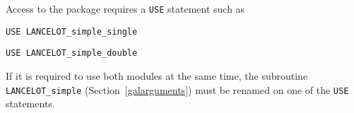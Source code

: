 \documentclass{galahad}
\newcommand{\fullpackagename}{LANC\-E\-LOT\-\_simple}
\begin{document}
Access to the package requires a {\tt USE} statement such as

\medskip{}

\hskip0.5in {\tt USE \fullpackagename\_single}

\medskip{}

\hskip0.5in {\tt USE  \fullpackagename\_double}

\medskip

\noindent
If it is required to use both modules at the same time, 
the subroutine
{\tt \fullpackagename}
(Section~\ref{galarguments})
must be renamed on one of the {\tt USE} statements.


\galarguments
\end{document}
